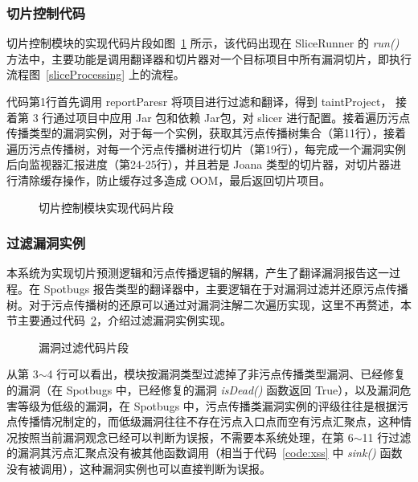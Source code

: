 \subsubsection{切片控制代码}

切片控制模块的实现代码片段如图~\ref{code:sliceControl} 所示，该代码出现在 SliceRunner 的 \textit{run()} 方法中，主要功能是调用翻译器和切片器对一个目标项目中所有漏洞切片，即执行流程图~\ref{sliceProcessing} 上的流程。

代码第1行首先调用 reportParesr 将项目进行过滤和翻译，得到 taintProject， 接着第 3 行通过项目中应用 Jar 包和依赖 Jar包，对 slicer 进行配置。接着遍历污点传播类型的漏洞实例，对于每一个实例，获取其污点传播树集合（第11行），接着遍历污点传播树，对每一个污点传播树进行切片（第19行），每完成一个漏洞实例后向监视器汇报进度（第24-25行），并且若是 Joana 类型的切片器，对切片器进行清除缓存操作，防止缓存过多造成 OOM，最后返回切片项目。

\begin{figure}[!htbp]
    \centering
    \begin{minipage}[!htbp]{0.9\textwidth}
        
    \end{minipage}
    \caption{切片控制模块实现代码片段}\label{code:sliceControl}
\end{figure}

\subsubsection{过滤漏洞实例}

本系统为实现切片预测逻辑和污点传播逻辑的解耦，产生了翻译漏洞报告这一过程。在 Spotbugs 报告类型的翻译器中，主要逻辑在于对漏洞过滤并还原污点传播树。对于污点传播树的还原可以通过对漏洞注解二次遍历实现，这里不再赘述，本节主要通过代码~\ref{code:sliceFilter}，介绍过滤漏洞实例实现。

\begin{figure}[!htbp]
    \centering
    \begin{minipage}[!htbp]{0.9\textwidth}
        
    \end{minipage}
    \caption{漏洞过滤代码片段}\label{code:sliceFilter}
\end{figure}

从第 3$\sim$4 行可以看出，模块按漏洞类型过滤掉了非污点传播类型漏洞、已经修复的漏洞（在 Spotbugs 中，已经修复的漏洞 \textit{isDead()} 函数返回 True），以及漏洞危害等级为低级的漏洞，在 Spotbugs 中，污点传播类漏洞实例的评级往往是根据污点传播情况制定的，而低级漏洞往往不存在污点入口点而空有污点汇聚点，这种情况按照当前漏洞观念已经可以判断为误报，不需要本系统处理，在第 6$\sim$11 行过滤的漏洞其污点汇聚点没有被其他函数调用（相当于代码~\ref{code:xss} 中 \textit{sink()} 函数没有被调用），这种漏洞实例也可以直接判断为误报。

